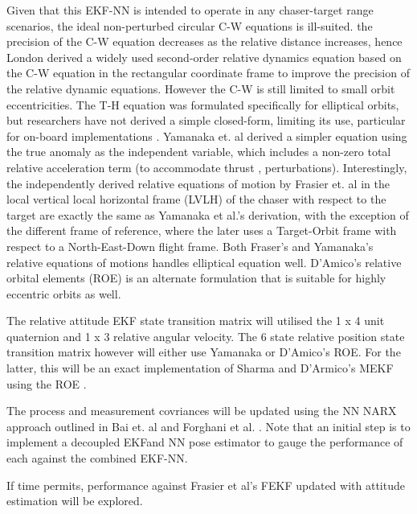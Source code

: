  Given that this EKF-NN is intended to operate in any chaser-target range scenarios, the ideal non-perturbed circular C-W equations \cite{CW} is ill-suited. the precision of the C-W equation decreases as the relative distance increases, hence London \cite{londonSecondApproximateSol63} derived a widely used second-order relative dynamics equation based on the C-W equation in the rectangular coordinate frame to improve the precision of the relative dynamic equations. However the C-W is still limited to small orbit eccentricities. The T-H equation was formulated specifically for elliptical orbits, but researchers have not derived a simple closed-form, limiting its use, particular for on-board implementations  \cite{luoSurvey13}. Yamanaka et. al  derived a simpler equation using the true anomaly as the independent variable, which includes a non-zero total relative acceleration term (to accommodate thrust , perturbations). Interestingly, the independently derived relative equations of motion by Frasier et. al \cite{frasierAdaptiveKF18} in the local vertical local horizontal frame (LVLH) of the chaser with respect to the target are exactly the same as Yamanaka et al.'s derivation, with the exception of the different frame of reference, where the later uses a Target-Orbit frame with respect to a North-East-Down flight frame. Both Fraser's and Yamanaka's relative equations of motions handles elliptical equation well. D'Amico's relative orbital elements (ROE) \cite{dAmicoPhdthesis} is an alternate formulation that is suitable for highly eccentric orbits as well.  
 
The relative attitude EKF state transition matrix will utilised the 1 x 4 unit quaternion and 1 x 3 relative angular velocity.  The 6 state relative position state transition matrix however will either use Yamanaka \footnotemark{} or  D'Amico's ROE. For the latter, this will be an exact implementation of Sharma and D'Armico's MEKF using the ROE \cite{sharmePoseNonC17a}. 

The process and measurement covriances will be updated using the NN NARX approach outlined in Bai et. al \cite{baiKf20} and Forghani et al. \cite{ForghaniOrbitNN11}. Note that an initial step is to implement a decoupled EKFand NN pose estimator to gauge the performance of each against the combined  EKF-NN.

If time permits, performance against Frasier et al's FEKF \cite{frasierAdaptiveKF18} updated with attitude estimation will be explored.

